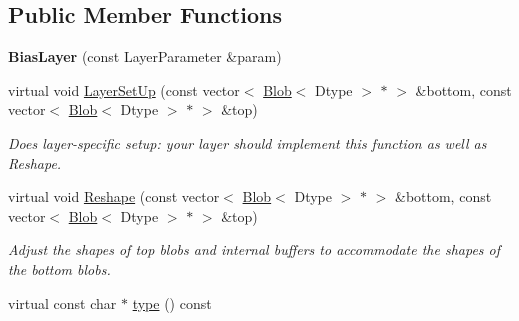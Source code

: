 \subsection*{Public Member Functions}
\begin{DoxyCompactItemize}
\item 
{\bfseries Bias\+Layer} (const Layer\+Parameter \&param)\hypertarget{classcaffe_1_1BiasLayer_a12e9da7fe06423dd2aaa0d1aba1ae460}{}\label{classcaffe_1_1BiasLayer_a12e9da7fe06423dd2aaa0d1aba1ae460}

\item 
virtual void \hyperlink{classcaffe_1_1BiasLayer_a88b3f3aad8ec2640c16a0c7bfdbf116a}{Layer\+Set\+Up} (const vector$<$ \hyperlink{classcaffe_1_1Blob}{Blob}$<$ Dtype $>$ $\ast$ $>$ \&bottom, const vector$<$ \hyperlink{classcaffe_1_1Blob}{Blob}$<$ Dtype $>$ $\ast$ $>$ \&top)
\begin{DoxyCompactList}\small\item\em Does layer-\/specific setup\+: your layer should implement this function as well as Reshape. \end{DoxyCompactList}\item 
virtual void \hyperlink{classcaffe_1_1BiasLayer_a6062d64c98cb115c304c78fe424091c3}{Reshape} (const vector$<$ \hyperlink{classcaffe_1_1Blob}{Blob}$<$ Dtype $>$ $\ast$ $>$ \&bottom, const vector$<$ \hyperlink{classcaffe_1_1Blob}{Blob}$<$ Dtype $>$ $\ast$ $>$ \&top)
\begin{DoxyCompactList}\small\item\em Adjust the shapes of top blobs and internal buffers to accommodate the shapes of the bottom blobs. \end{DoxyCompactList}\item 
virtual const char $\ast$ \hyperlink{classcaffe_1_1BiasLayer_aaa97578fe0968c367848dbc41c64e215}{type} () const \hypertarget{classcaffe_1_1BiasLayer_aaa97578fe0968c367848dbc41c64e215}{}\label{classcaffe_1_1BiasLayer_aaa97578fe0968c367848dbc41c64e215}


\end{DoxyCompactItemize}
